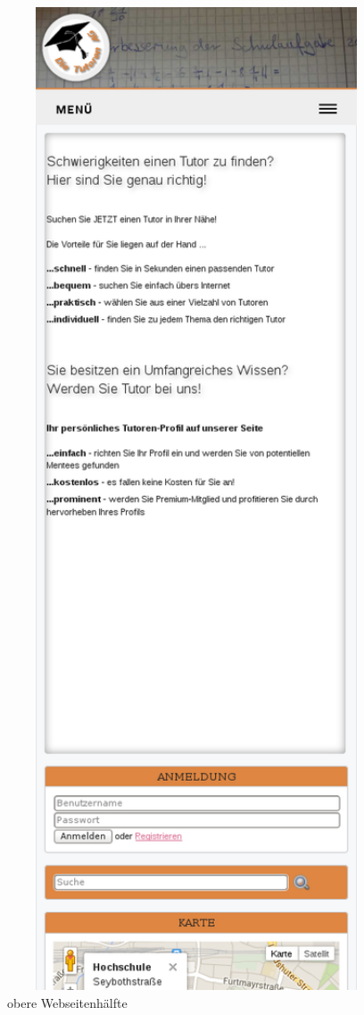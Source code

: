\begin{figure}[!htbp]
 \centering
 \includegraphics[width=1\textwidth]{../Screenshots/responsive4001}
 \caption{obere Webseitenhälfte}
 \label{fig:responsive4001}
\end{figure}

